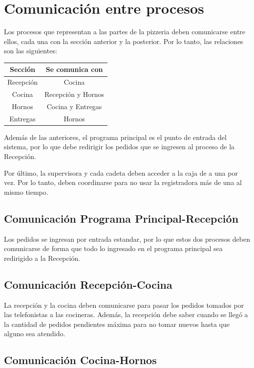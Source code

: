 \documentclass[11pt,spanish,a4paper,openany,notitlepage]{article}
\begin{document}
\section{Comunicación entre procesos}

Los procesos que representan a las partes de la pizzeria deben comunicarse entre ellos, cada una 
con la sección anterior y la posterior. Por lo tanto, las relaciones son las siguientes:

\begin{center}
\begin{tabular}{|c|c|}
\hline
Sección & Se comunica con \\
\hline
Recepción & Cocina \\
\hline
Cocina & Recepción y Hornos \\
\hline
Hornos & Cocina y Entregas \\
\hline
Entregas & Hornos \\
\hline
\end{tabular}
\end{center}

Además de las anteriores, el programa principal es el punto de entrada del sistema, por lo que debe 
redirigir los pedidos que se ingresen al proceso de la Recepción. 

Por último, la supervisora y cada cadeta deben acceder a la caja de a una por vez. Por lo tanto, 
deben coordinarse para no usar la registradora más de una al mismo tiempo.

\subsection{Comunicación Programa Principal-Recepción}

Los pedidos se ingresan por entrada estandar, por lo que estos dos procesos deben comunicarse de 
forma que todo lo ingresado en el programa principal sea redirigido a la Recepción. 

\subsection{Comunicación Recepción-Cocina}

La recepción y la cocina deben comunicarse para pasar los pedidos tomados por las telefonistas a 
las cocineras. Además, la recepción debe saber cuando se llegó a la cantidad de pedidos pendientes 
máxima para no tomar nuevos hasta que alguno sea atendido.

\subsection{Comunicación Cocina-Hornos}
\end{document}

